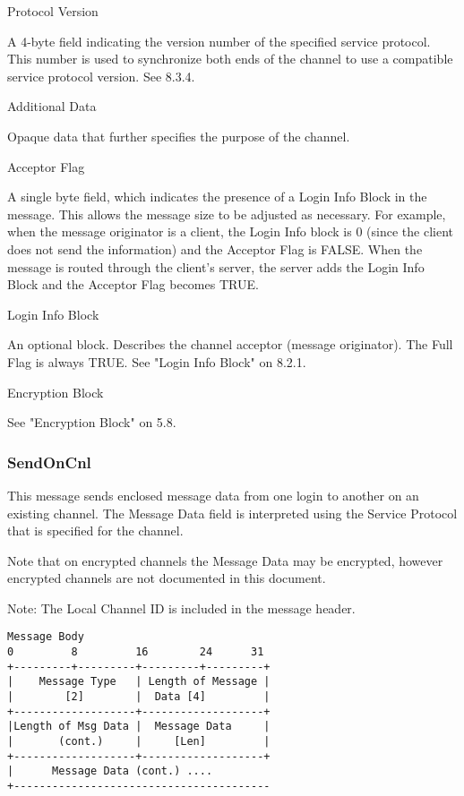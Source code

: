 \documentclass[titlepage,oneside]{book}
\begin{document}
\par{} Protocol Version

\subpar{} A 4-byte field indicating the version number of the specified service
  protocol. This number is used to synchronize both ends of the channel
  to use a compatible service protocol version. See 
  8.3.4.

\par{} Additional Data

\subpar{}  Opaque data that further specifies the purpose of the channel.

\par{} Acceptor Flag

\subpar{}  A single byte field, which indicates the presence of a Login Info
  Block in the message. This allows the message size to be adjusted as
  necessary. For example, when the message originator is a client, the
  Login Info block is 0 (since the client does not send the
  information) and the Acceptor Flag is FALSE. When the message is
  routed through the client's server, the server adds the Login Info
  Block and the Acceptor Flag becomes TRUE.

\par{} Login Info Block

\subpar{}  An optional block. Describes the channel acceptor (message
  originator). The Full Flag is always TRUE. See "Login Info Block" on
  8.2.1.

\par{} Encryption Block

\subpar{}  See "Encryption Block" on 5.8.

\subsubsection{SendOnCnl}

\par{} This message sends enclosed message data from one login to another on
an existing channel. The Message Data field is interpreted using the
Service Protocol that is specified for the channel.

\par{} Note that on encrypted channels the Message Data may be encrypted,
however encrypted channels are not documented in this document.

\par{} Note: The Local Channel ID is included in the message header.

\begin{verbatim}
Message Body
0         8         16        24      31
+---------+---------+---------+---------+
|    Message Type   | Length of Message |
|        [2]        |  Data [4]         |
+-------------------+-------------------+
|Length of Msg Data |  Message Data     |
|       (cont.)     |     [Len]         |
+-------------------+-------------------+
|      Message Data (cont.) ....
+----------------------------------------
\end{verbatim}
\end{document}
